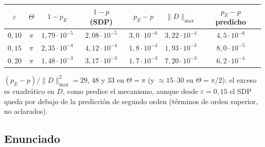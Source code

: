 \documentclass[11pt,a4paper]{article}
\theoremstyle{definition}
\theoremstyle{remark}
\newcommand{\eps}{\varepsilon}
\newcommand{\pE}{p_{E}}
\begin{document}
\begin{center}
\begin{tabular}{ccccccc}
\toprule
$\eps$ & $\Theta$ & $1-\pE$ & $1-p$ (SDP) & $\pE-p$ & $\|D\|_{\max}$ & $\pE-p$ predicho\\
\midrule
$0{,}10$ & $\pi$ & $1{,}79\cdot10^{-5}$ & $2{,}08\cdot10^{-5}$ & $3{,}0\cdot10^{-6}$ & $3{,}22\cdot10^{-4}$ & $4{,}5\cdot10^{-6}$\\
$0{,}15$ & $\pi$ & $2{,}35\cdot10^{-4}$ & $4{,}12\cdot10^{-4}$ & $1{,}8\cdot10^{-4}$ & $1{,}93\cdot10^{-3}$ & $8{,}0\cdot10^{-5}$\\
$0{,}20$ & $\pi$ & $1{,}48\cdot10^{-3}$ & $3{,}17\cdot10^{-3}$ & $1{,}7\cdot10^{-3}$ & $7{,}20\cdot10^{-3}$ & $6{,}2\cdot10^{-4}$\\
\bottomrule
\end{tabular}
\end{center}

\noindent
$(\pE-p)/\|D\|_{\max}^2=29$, $48$ y $33$ en $\Theta=\pi$ (y $\approx15$--$30$ en $\Theta=\pi/2$): el
exceso es cuadrático en $D$, como predice el mecanismo, aunque desde $\eps=0{,}15$ el SDP queda por debajo de
la predicción de segundo orden (términos de orden superior, no aclarados).

\subsection{Enunciado}
\end{document}

